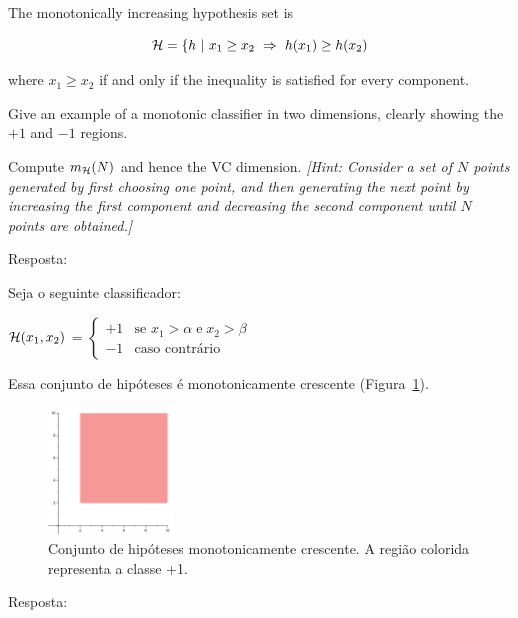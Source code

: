 \begin{enunciado}{15}
    The monotonically increasing hypothesis set is
    
    $$ \mathcal{H} = \{ h~|~ x_1 \ge x_2 ~ \Rightarrow ~ h(x_1) \ge h(x_2) $$
    
    where $x_1 \ge x_2$ if and only if the inequality is satisfied for every component.
    
     Give an example of a monotonic classifier in two dimensions, clearly showing the $+1$ and $-1$ regions.

    	

    
     Compute $m_{\mathcal{H}}(N)$ and hence the VC dimension. \textit{[Hint: Consider a set of $N$ points generated by first choosing one point, and then generating the next point by increasing the first component and decreasing the second component until $N$ points are obtained.]}

\end{enunciado}
     Resposta:
    
    Seja o seguinte classificador:

   $\mathcal{H}(x_1, x_2)$ = 
    $
    \begin{cases}
	    +1 &\mbox{se } x_1 > \alpha \; \text{e} \; x_2 > \beta  \\ 
	    -1 &\mbox{caso contrário }
    \end{cases}
    $

    Essa conjunto de hipóteses é monotonicamente crescente (Figura~\ref{fig:ex15a}).

    \begin{figure}[h]
	    \includegraphics[width=0.3\textwidth]{ex15a}
	    \caption{Conjunto de hipóteses monotonicamente crescente. A região colorida representa a classe +1.}
	    \label{fig:ex15a}
    \end{figure}
    
     Resposta:

